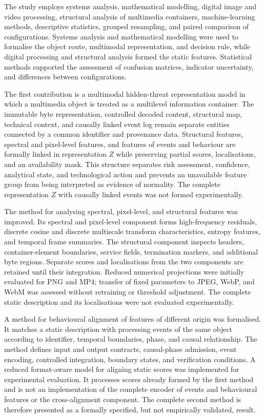 The study employs systems analysis, mathematical modelling, digital image and video processing, structural analysis of multimedia containers, machine-learning methods, descriptive statistics, grouped resampling, and paired comparison of configurations. Systems analysis and mathematical modelling were used to formalise the object route, multimodal representation, and decision rule, while digital processing and structural analysis formed the static features. Statistical methods supported the assessment of confusion matrices, indicator uncertainty, and differences between configurations.

The first contribution is a multimodal hidden-threat representation model in which a multimedia object is treated as a multilevel information container. The immutable byte representation, controlled decoded content, structural map, technical context, and causally linked event log remain separate entities connected by a common identifier and provenance data. Structural features, spectral and pixel-level features, and features of events and behaviour are formally linked in representation $Z$ while preserving partial scores, localisations, and an availability mask. This structure separates risk assessment, confidence, analytical state, and technological action and prevents an unavailable feature group from being interpreted as evidence of normality. The complete representation $Z$ with causally linked events was not formed experimentally.

The method for analysing spectral, pixel-level, and structural features was improved. Its spectral and pixel-level component forms high-frequency residuals, discrete cosine and discrete multiscale transform characteristics, entropy features, and temporal frame summaries. The structural component inspects headers, container-element boundaries, service fields, termination markers, and additional byte regions. Separate scores and localisations from the two components are retained until their integration. Reduced numerical projections were initially evaluated for PNG and MP4; transfer of fixed parameters to JPEG, WebP, and WebM was assessed without retraining or threshold adjustment. The complete static description and its localisations were not evaluated experimentally.

A method for behavioural alignment of features of different origin was formalised. It matches a static description with processing events of the same object according to identifier, temporal boundaries, phase, and causal relationship. The method defines input and output contracts, causal-phase admission, event encoding, controlled integration, boundary states, and verification conditions. A reduced format-aware model for aligning static scores was implemented for experimental evaluation. It processes scores already formed by the first method and is not an implementation of the complete encoder of events and behavioural features or the cross-alignment component. The complete second method is therefore presented as a formally specified, but not empirically validated, result.

